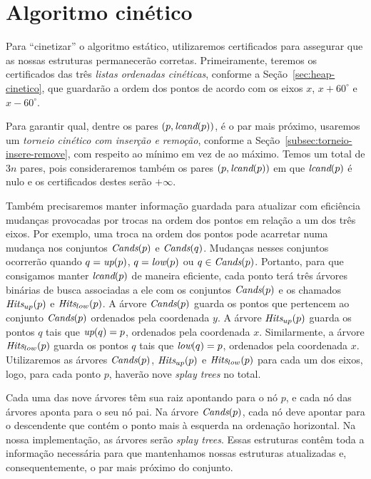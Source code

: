 
\FloatBarrier


\section{Algoritmo cinético}\label{sec:algoritmo-cinetico}

Para ``cinetizar'' o algoritmo estático, utilizaremos certificados para assegurar que as nossas
estruturas permanecerão corretas.
Primeiramente, teremos os certificados das três \textit{listas ordenadas cinéticas}, conforme a
Seção~\ref{sec:heap-cinetico}, que guardarão a ordem dos pontos de acordo com os eixos $x$, $x +
60^\circ$ e $x - 60^\circ$.

Para garantir qual, dentre os pares $(p, \textit{lcand}(p))$, é o par mais próximo, usaremos um
\textit{torneio cinético com inserção e remoção}, conforme a Seção~\ref{subsec:torneio-insere-remove},
com respeito ao mínimo em vez de ao máximo.
Temos um total de $3n$ pares, pois consideraremos também os pares $(p, \textit{lcand}(p))$ em que
$\textit{lcand}(p)$ é nulo e os certificados destes serão $+\infty$.

Também precisaremos manter informação guardada para atualizar com eficiência mudanças provocadas
por trocas na ordem dos pontos em relação a um dos três eixos.
Por exemplo, uma troca na ordem dos pontos pode acarretar numa mudança nos conjuntos $\textit{Cands}(p)$ e
$\textit{Cands}(q)$.
Mudanças nesses conjuntos ocorrerão quando $q = \textit{up}(p)$, $q = \textit{low}(p)$ ou $q \in \textit{Cands}(p)$.
Portanto, para que consigamos manter $\textit{lcand}(p)$ de maneira eficiente, cada ponto terá três árvores
binárias de busca associadas a ele com os conjuntos $\textit{Cands}(p)$ e os chamados $\textit{Hits}_{up}(p)$ e
$\textit{Hits}_{low}(p)$.
A árvore $\textit{Cands}(p)$ guarda os pontos que pertencem ao conjunto $\textit{Cands}(p)$ ordenados pela
coordenada $y$.
A árvore $\textit{Hits}_{up}(p)$ guarda os pontos $q$ tais que $\textit{up}(q) = p$, ordenados pela coordenada $x$.
Similarmente, a árvore $\textit{Hits}_{low}(p)$ guarda os pontos $q$ tais que $\textit{low}(q) = p$, ordenados
pela coordenada $x$.
Utilizaremos as árvores $\textit{Cands}(p)$, $\textit{Hits}_{up}(p)$ e $\textit{Hits}_{low}(p)$ para cada um dos eixos,
logo, para cada ponto $p$, haverão nove \textit{splay trees} no total.

Cada uma das nove árvores têm sua raiz apontando para o nó $p$, e cada nó das árvores aponta para
o seu nó pai.
Na árvore $\textit{Cands}(p)$, cada nó deve apontar para o descendente que contém o ponto mais à esquerda
na ordenação horizontal.
Na nossa implementação, as árvores serão \textit{splay trees}.
Essas estruturas contêm toda a informação necessária para que mantenhamos nossas estruturas
atualizadas e, consequentemente, o par mais próximo do conjunto.

